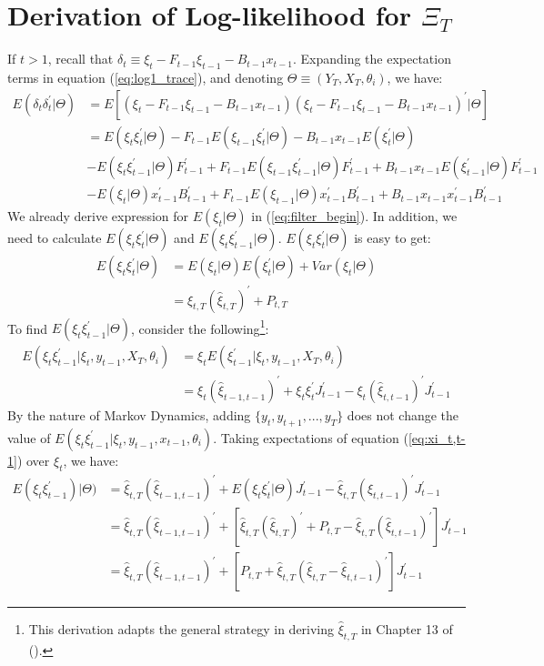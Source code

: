 \documentclass[12pt]{article}
\numberwithin{equation}{section}
\begin{document}
\section{Derivation of Log-likelihood for $\Xi_T$} \label{ap:log}
If $t>1$, recall that $\delta_t \equiv \xi_t - F_{t-1}\xi_{t-1} - B_{t-1}x_{t-1}$. Expanding the expectation terms in equation (\ref{eq:log1_trace}), and denoting $\Theta \equiv (Y_T,X_T, \theta_i)$, we have:
\begin{align*}
    E(\delta_t\delta_t^{'}|\Theta) &= E[(\xi_t-F_{t-1}\xi_{t-1}-B_{t-1}x_{t-1}) 
    (\xi_t-F_{t-1}\xi_{t-1}-B_{t-1}x_{t-1})^{'}|\Theta] \\
    &= E(\xi_t\xi_t^{'}|\Theta) - F_{t-1}E(\xi_{t-1}\xi_{t}^{'}|\Theta) - B_{t-1}x_{t-1}E(\xi_t^{'}|\Theta) \\
    &- E(\xi_t\xi_{t-1}^{'}|\Theta)F_{t-1}^{'} + F_{t-1}E(\xi_{t-1}\xi_{t-1}^{'}|\Theta)F_{t-1}^{'}
    +B_{t-1}x_{t-1}E(\xi_{t-1}^{'}|\Theta)F_{t-1}^{'} \\
    &- E(\xi_t|\Theta)x_{t-1}^{'}B_{t-1}^{'} + F_{t-1}E(\xi_{t-1}|\Theta)x_{t-1}^{'}B_{t-1}^{'}
    +B_{t-1}x_{t-1}x_{t-1}^{'}B_{t-1}^{'}
\end{align*}
We already derive expression for $E(\xi_t|\Theta)$ in (\ref{eq:filter_begin}). In addition, we need to calculate $E(\xi_t\xi_t^{'}|\Theta)$ and $E(\xi_t\xi_{t-1}^{'}|\Theta)$. $E(\xi_t\xi_t^{'}|\Theta)$ is easy to  get:
\begin{align*}
    E(\xi_t\xi_t^{'}|\Theta) & = E(\xi_t|\Theta)E(\xi_t^{'}|\Theta) + Var(\xi_t|\Theta) \\
    &= \hat{\xi}_{t,T}(\hat{\xi}_{t,T})^{'} + P_{t,T}
\end{align*}
To find $E(\xi_t\xi_{t-1}^{'}|\Theta)$, consider the following\footnote{This derivation adapts the general strategy in deriving $\hat{\xi}_{t,T}$ in Chapter 13 of (\cite{hamilton_1994}).}:
\begin{align}
    E(\xi_t\xi_{t-1}^{'}|\xi_t,y_{t-1},X_T,\theta_i) &= \xi_tE(\xi_{t-1}^{'}|\xi_t,y_{t-1},X_T,\theta_i) \nonumber \\
    &= \xi_t(\hat{\xi}_{t-1,t-1})^{'} + \xi_t\xi_t^{'}J_{t-1}^{'} - \xi_{t}(\hat{\xi}_{t,t-1})^{'}J_{t-1}^{'} \label{eq:xi_t,t-1}
\end{align}
By the nature of Markov Dynamics, adding $\{y_t, y_{t+1}, ..., y_T\}$ does not change the value of $E(\xi_t\xi_{t-1}^{'}|\xi_t,y_{t-1},x_{t-1},\theta_i)$. Taking expectations of equation (\ref{eq:xi_t,t-1}) over $\xi_t$, we have:
\begin{align*}
    E(\xi_t\xi_{t-1}^{'})|\Theta) &= \hat{\xi}_{t,T}(\hat{\xi}_{t-1,t-1})^{'} + E(\xi_t\xi_t^{'}|\Theta)J_{t-1}^{'}
    -\hat{\xi}_{t,T}(\hat{\xi}_{t,t-1})^{'}J_{t-1}^{'} \\
    &= \hat{\xi}_{t,T}(\hat{\xi}_{t-1,t-1})^{'} + [\hat{\xi}_{t,T}(\hat{\xi}_{t,T})^{'} + P_{t,T} 
    -\hat{\xi}_{t,T}(\hat{\xi}_{t,t-1})^{'}]J_{t-1}^{'} \\
    &= \hat{\xi}_{t,T}(\hat{\xi}_{t-1,t-1})^{'} + [P_{t,T} + \hat{\xi}_{t,T}(\hat{\xi}_{t,T}-\hat{\xi}_{t,t-1})^{'}]J_{t-1}^{'}
\end{align*}
\end{document}
